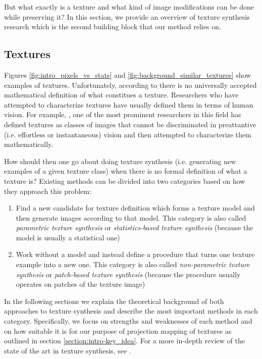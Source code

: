 But what exactly is a texture and what kind of image modifications can be done while preserving it? In this section, we provide an overview of texture synthesis research which is the second building block that our method relies on.

\subsection{Textures}
\label{section:background-texture_synthesis-textures}

Figures \ref{fig:intro_pixels_vs_stats} and \ref{fig:background_similar_textures} show examples of textures. Unfortunately, according to \citet{Raad2018} there is no universally accepted mathematical definition of what constitues a texture. Researchers who have attempted to characterize textures have usually defined them in terms of human vision. For example, \citet{Julesz1962}, one of the most prominent researchers in this field has defined textures as classes of images that cannot be discriminated in preattantive (i.e. effortless or instantaneous) vision and then attempted to characterize them mathematically.

How should then one go about doing texture synthesis (i.e. generating new examples of a given texture class) when there is no formal definition of what a texture is? Existing methods can be divided into two categories based on how they approach this problem:

\begin{enumerate}
    \item Find a new candidate for texture definition which forms a texture model and then generate images according to that model. This category is also called \textit{parametric texture synthesis} or \textit{statistics-based texture synthesis} (because the model is usually a statistical one)
    \item Work without a model and instead define a procedure that turns one texture example into a new one. This category is also called \textit{non-parametric texture synthesis} or \textit{patch-based texture synthesis} (because the procedure usually operates on patches of the texture image)
\end{enumerate}

In the following sections we explain the theoretical background of both approaches to texture synthesis and describe the most important methods in each category. Specifically, we focus on strengths and weaknesses of each method and on how suitable it is for our purpose of projection mapping of textures as outlined in section \ref{section:intro-key_idea}. For a more in-depth review of the state of the art in texture synthesis, see \citet{Raad2018}.

